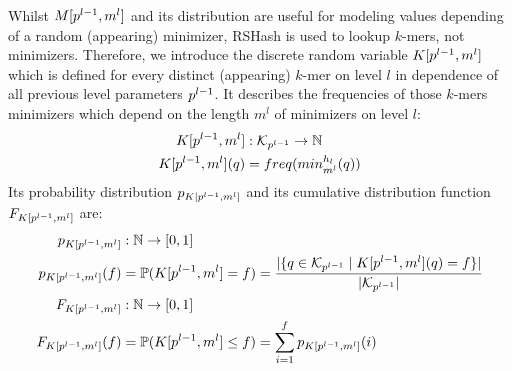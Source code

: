 \documentclass[a4paper,titlepage,onecolumn,oneside,12pt,nenglish,titlepage=firstiscover]{scrbook}
\theoremstyle{plain} %
\theoremstyle{definition} %
\theoremstyle{remark} %
\theoremstyle{plain}
\newcommand{\NN}{\mathbb{N}} %
\newcommand{\minimizerLength}{m}
\newcommand{\level}{l}
\newcommand{\kmer}{q}
\begin{document}
Whilst $\manualZV{M}{\levelParameters{\level-1}}{\minimizerLength^\level}$ and its distribution are useful for modeling values depending of a random (appearing) minimizer, RSHash is used to lookup $k$-mers, not minimizers. Therefore, we introduce the discrete random variable $\manualZV{K}{\levelParameters{\level-1}}{\minimizerLength^\level}$ which is defined for every distinct (appearing) $k$-mer on level $\level$ in dependence of all previous level parameters $\levelParameters{\level-1}$. It describes the frequencies of those $k$-mers minimizers which depend on the length $\minimizerLength^\level$ of minimizers on level $\level$:
\begin{align}
	\manualZV{K}{\levelParameters{\level-1}}{\minimizerLength^\level} &: \distinctKmers{\level} \rightarrow \NN
	\\
	\manualZV{K}{\levelParameters{\level-1}}{\minimizerLength^\level}(\kmer) &= \frequencyOf{\minimizerOf{\kmer}{\level}}
\end{align}
Its probability distribution $\probabilityDistribution{\manualZV{K}{\levelParameters{\level-1}}{\minimizerLength^\level}}$ and its cumulative distribution function $\CDF{\manualZV{K}{\levelParameters{\level-1}}{\minimizerLength^\level}}$ are: 
\begin{align}
	\probabilityDistribution{\manualZV{K}{\levelParameters{\level-1}}{\minimizerLength^\level}} &: \NN \rightarrow [0,1]
	\\
	\probabilityDistribution{\manualZV{K}{\levelParameters{\level-1}}{\minimizerLength^\level}}(f) &= \mathbb{P}(\manualZV{K}{\levelParameters{\level-1}}{\minimizerLength^\level} = f) = \frac{|\{\kmer \in \distinctKmers{\level} \mid \manualZV{K}{\levelParameters{\level-1}}{\minimizerLength^\level}(\kmer)=f \}|}{|\distinctKmers{\level}|}
	\\
	\CDF{\manualZV{K}{\levelParameters{\level-1}}{\minimizerLength^\level}} &: \NN \rightarrow [0,1]\\
	\CDF{\manualZV{K}{\levelParameters{\level-1}}{\minimizerLength^\level}}(f) &= \mathbb{P}(\manualZV{K}{\levelParameters{\level-1}}{\minimizerLength^\level} \leq f) = \sum_{i=1}^f \probabilityDistribution{\manualZV{K}{\levelParameters{\level-1}}{\minimizerLength^\level}}(i)
\end{align}
\end{document}
